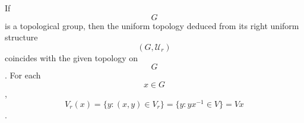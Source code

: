 If $$G$$ is a topological group, then the uniform topology deduced from its right uniform structure $$(G, \mathcal{U}_r)$$ coincides with the given topology on $$G$$. For each $$x \in G$$, $$V_r(x) = \{y : (x, y) \in V_r\} = \{y : yx^{-1} \in V\} = Vx$$.
